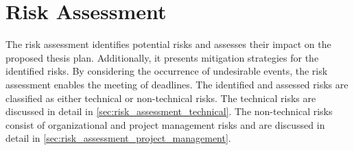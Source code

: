 \section{Risk Assessment}
\label{sec:risk_assessment}
The risk assessment identifies potential risks and assesses their impact on the proposed thesis plan.
Additionally, it presents mitigation strategies for the identified risks.
By considering the occurrence of undesirable events, the risk assessment enables the meeting of deadlines.
The identified and assessed risks are classified as either technical or non-technical risks.
The technical risks are discussed in detail in \autoref{sec:risk_assessment_technical}.
The non-technical risks consist of organizational and project management risks and are discussed in detail in \autoref{sec:risk_assessment_project_management}.

